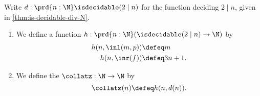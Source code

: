 \begin{defn}
  Write $d:\prd{n:\N}\isdecidable(2\mid n)$ for the function deciding $2\mid n$, given in \cref{thm:is-decidable-div-N}.
  \begin{enumerate}
  \item We define a function $h:\prd{n:\N}(\isdecidable(2\mid n)\to \N)$ by
    \begin{align*}
      h(n,\inl(m,p)) & \defeq m \\
      h(n,\inr(f)) & \defeq 3n+1.
    \end{align*}
  \item We define the  $\collatz:\N\to \N$ by
    \begin{equation*}
      \collatz(n)\defeq h(n,d(n)).
    \end{equation*}
  \end{enumerate}
\end{defn}

